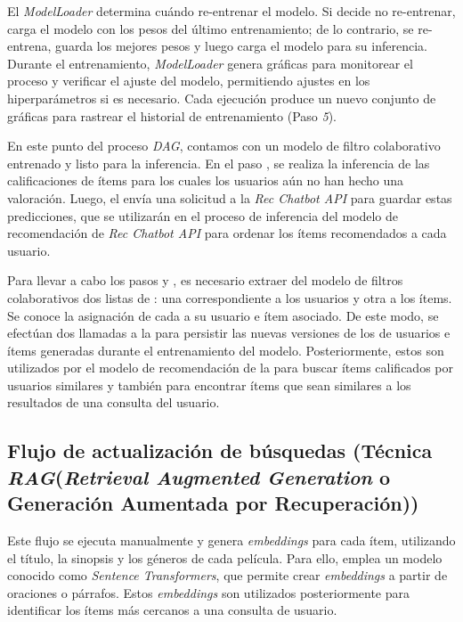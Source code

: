 \documentclass[11pt,a4paper,twoside]{thesis}
\begin{document}
El \textit{ModelLoader} determina cuándo re-entrenar el modelo. Si decide no re-entrenar, carga el modelo con los pesos del último entrenamiento; de lo contrario, se re-entrena, guarda los mejores pesos y luego carga el modelo para su inferencia. Durante el entrenamiento, \textit{ModelLoader} genera gráficas para monitorear el proceso y verificar el ajuste del modelo, permitiendo ajustes en los hiperparámetros si es necesario. Cada ejecución produce un nuevo conjunto de gráficas para rastrear el historial de entrenamiento (Paso \textit{5}).

En este punto del proceso \textit{DAG}, contamos con un modelo de filtro colaborativo entrenado y listo para la inferencia. En el paso , se realiza la inferencia de las calificaciones de ítems para los cuales los usuarios aún no han hecho una valoración. Luego, el  envía una solicitud  a la \textit{Rec Chatbot API} para guardar estas predicciones, que se utilizarán en el proceso de inferencia del modelo de recomendación de \textit{Rec Chatbot API} para ordenar los ítems recomendados a cada usuario.

Para llevar a cabo los pasos  y , es necesario extraer del modelo de filtros colaborativos dos listas de : una correspondiente a los usuarios y otra a los ítems. Se conoce la asignación de cada  a su usuario e ítem asociado. De este modo, se efectúan dos llamadas  a la  para persistir las nuevas versiones de los  de usuarios e ítems generadas durante el entrenamiento del modelo. Posteriormente, estos  son utilizados por el modelo de recomendación de la  para buscar ítems calificados por usuarios similares y también para encontrar ítems que sean similares a los resultados de una consulta del usuario.


\subsection{Flujo de actualización de búsquedas (Técnica \textit{RAG}(\textit{Retrieval Augmented Generation} o Generación Aumentada por Recuperación))}

Este flujo se ejecuta manualmente y genera \textit{embeddings} para cada ítem, utilizando el título, la sinopsis y los géneros de cada película. Para ello, emplea un modelo conocido como \textit{Sentence Transformers}, que permite crear \textit{embeddings} a partir de oraciones o párrafos. Estos \textit{embeddings} son utilizados posteriormente para identificar los ítems más cercanos a una consulta de usuario.
\end{document}
